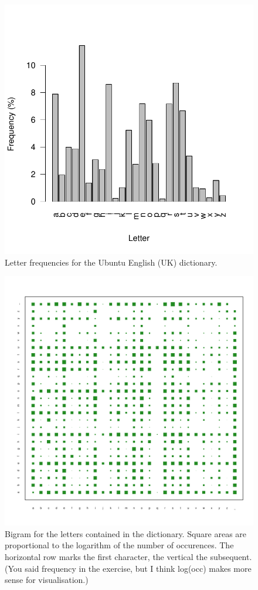 \documentclass[12pt]{article}\usepackage[]{graphicx}\usepackage[]{color}
\theoremstyle{plain}
\theoremstyle{definition}
\begin{document}
\begin{figure}[H]
  \centering
  \includegraphics[scale=.7]{word_processing_letter_frequency.pdf}
  \caption{Letter frequencies for the Ubuntu English (UK) dictionary.}
\end{figure}
\begin{figure}[H]
  \centering
  \hspace{-2cm}
  \includegraphics[scale=.7]{word_processing_bigram.pdf}
  \caption{Bigram for the letters contained in the dictionary. Square areas are proportional to the logarithm of the number of occurences.     The horizontal row marks the first character, the vertical the subsequent. (You said frequency in the exercise, but I think log(occ) makes   more sense for visualisation.)}
\end{figure}
\end{document}
